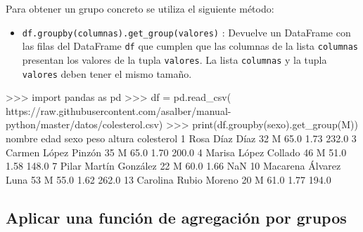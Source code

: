 \documentclass[
  spanish,
  a4paper,
]{scrreport}
\newenvironment{Shaded}{\begin{snugshade}}{\end{snugshade}}
\newcommand{\BuiltInTok}[1]{\textcolor[rgb]{0.00,0.23,0.31}{#1}}
\newcommand{\DecValTok}[1]{\textcolor[rgb]{0.68,0.00,0.00}{#1}}
\newcommand{\FloatTok}[1]{\textcolor[rgb]{0.68,0.00,0.00}{#1}}
\newcommand{\ImportTok}[1]{\textcolor[rgb]{0.00,0.46,0.62}{#1}}
\newcommand{\NormalTok}[1]{\textcolor[rgb]{0.00,0.23,0.31}{#1}}
\newcommand{\OperatorTok}[1]{\textcolor[rgb]{0.37,0.37,0.37}{#1}}
\newcommand{\StringTok}[1]{\textcolor[rgb]{0.13,0.47,0.30}{#1}}
\providecommand{\tightlist}{%
  \setlength{\itemsep}{0pt}\setlength{\parskip}{0pt}}
\begin{document}
Para obtener un grupo concreto se utiliza el siguiente método:

\begin{itemize}
\tightlist
\item
  \texttt{df.groupby(columnas).get\_group(valores)} : Devuelve un
  DataFrame con las filas del DataFrame \texttt{df} que cumplen que las
  columnas de la lista \texttt{columnas} presentan los valores de la
  tupla \texttt{valores}. La lista \texttt{columnas} y la tupla
  \texttt{valores} deben tener el mismo tamaño.
\end{itemize}

\begin{Shaded}
\begin{Highlighting}[]
\OperatorTok{\textgreater{}\textgreater{}\textgreater{}} \ImportTok{import}\NormalTok{ pandas }\ImportTok{as}\NormalTok{ pd}
\OperatorTok{\textgreater{}\textgreater{}\textgreater{}}\NormalTok{ df }\OperatorTok{=}\NormalTok{ pd.read\_csv(}
\StringTok{\textquotesingle{}https://raw.githubusercontent.com/asalber/manual{-}python/master/datos/colesterol.csv\textquotesingle{}}\NormalTok{)}
\OperatorTok{\textgreater{}\textgreater{}\textgreater{}} \BuiltInTok{print}\NormalTok{(df.groupby(}\StringTok{\textquotesingle{}sexo\textquotesingle{}}\NormalTok{).get\_group(}\StringTok{\textquotesingle{}M\textquotesingle{}}\NormalTok{))}
\NormalTok{                    nombre  edad sexo    peso   altura    colesterol}
\DecValTok{1}\NormalTok{           Rosa Díaz Díaz    }\DecValTok{32}\NormalTok{    M    }\FloatTok{65.0}     \FloatTok{1.73}         \FloatTok{232.0}
\DecValTok{3}\NormalTok{      Carmen López Pinzón    }\DecValTok{35}\NormalTok{    M    }\FloatTok{65.0}     \FloatTok{1.70}         \FloatTok{200.0}
\DecValTok{4}\NormalTok{     Marisa López Collado    }\DecValTok{46}\NormalTok{    M    }\FloatTok{51.0}     \FloatTok{1.58}         \FloatTok{148.0}
\DecValTok{7}\NormalTok{    Pilar Martín González    }\DecValTok{22}\NormalTok{    M    }\FloatTok{60.0}     \FloatTok{1.66}\NormalTok{           NaN}
\DecValTok{10}\NormalTok{   Macarena Álvarez Luna    }\DecValTok{53}\NormalTok{    M    }\FloatTok{55.0}     \FloatTok{1.62}         \FloatTok{262.0}
\DecValTok{13}\NormalTok{   Carolina Rubio Moreno    }\DecValTok{20}\NormalTok{    M    }\FloatTok{61.0}     \FloatTok{1.77}         \FloatTok{194.0}
\end{Highlighting}
\end{Shaded}

\subsection{Aplicar una función de agregación por
grupos}\label{aplicar-una-funciuxf3n-de-agregaciuxf3n-por-grupos}
\end{document}
